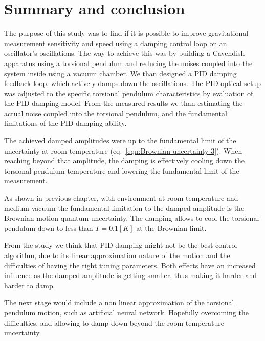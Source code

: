 \documentclass[\main/master.tex]{subfiles}
\begin{document}
\newspacing
\chapter{Summary and conclusion}\label{chapter:Summary and conclusion}
The purpose of this study was to find if it is possible to improve gravitational measurement sensitivity and speed using a damping control loop on an oscillator's oscillations. The way to achieve this was by building a Cavendish apparatus using a torsional pendulum and reducing the noises coupled into the system inside using a vacuum chamber. We than designed a PID damping feedback loop, which actively damps down the oscillations. The PID optical setup was adjusted to the specific torsional pendulum characteristics by evaluation of the PID damping model. From the measured results we than estimating the actual noise coupled into the torsional pendulum, and the fundamental limitations of the PID damping ability.
\par\noindent
The achieved damped amplitudes were up to the fundamental limit of the uncertainty at room temperature (eq.~\ref{eqn:Brownian uncertainty 3}). When reaching beyond that amplitude, the damping is effectively cooling down the torsional pendulum temperature and lowering the fundamental limit of the measurement. 
\par\noindent
As shown in previous chapter, with environment at room temperature and medium vacuum the fundamental limitation to the damped amplitude is the Brownian motion quantum uncertainty. The damping allows to cool the torsional pendulum down to less than $T=0.1[K]$ at the Brownian limit.
\par\noindent
From the study we think that PID damping might not be the best control algorithm, due to its linear approximation nature of the motion and the difficulties of having the right tuning parameters. Both effects have an increased influence as the damped amplitude is getting smaller, thus making it harder and harder to damp.
\par\noindent
The next stage would include a non linear approximation of the torsional pendulum motion, such as artificial neural network. Hopefully overcoming the difficulties, and allowing to damp down beyond the room temperature uncertainty. 
\end{document}
